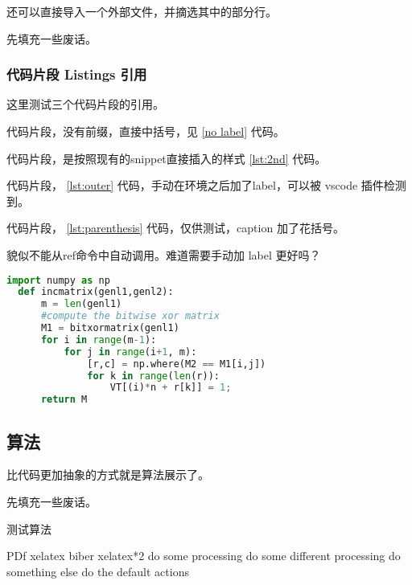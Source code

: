 \documentclass[../Main/thesis]{subfiles}
\begin{document}
还可以直接导入一个外部文件，并摘选其中的部分行。



先填充一些废话。\zhlipsum[12]

\subsubsection{代码片段 Listings 引用}

这里测试三个代码片段的引用。

代码片段，没有前缀，直接中括号，见 \ref{no label} 代码。

代码片段，是按照现有的snippet直接插入的样式 \ref{lst:2nd} 代码。

代码片段， \ref{lst:outer} 代码，手动在环境之后加了label，可以被 vscode 插件检测到。

代码片段， \ref{lst:parenthesis} 代码，仅供测试，caption 加了花括号。

貌似不能从ref命令中自动调用。难道需要手动加 label 更好吗？
\begin{lstlisting}[language=Python,
  caption={Must have Parenthesis},
  label=lst:parenthesis]
  import numpy as np
  def incmatrix(genl1,genl2):
      m = len(genl1)
      #compute the bitwise xor matrix
      M1 = bitxormatrix(genl1)
      for i in range(m-1):
          for j in range(i+1, m):
              [r,c] = np.where(M2 == M1[i,j])
              for k in range(len(r)):
                  VT[(i)*n + r[k]] = 1;
      return M
\end{lstlisting}
\subsection{算法}
\label{ssc:algo}

比代码更加抽象的方式就是算法展示了。

先填充一些废话。\zhlipsum[7]

\begin{minipage}{0.75\textwidth}

\begin{algorithm}[H]
  \caption{测试算法}
  \label{alg:test}
    \begin{algorithmic}[1]
      \REQUIRE PDf
      \ENSURE xelatex biber xelatex*2
      \STATE do some processing
      \STATE do some different processing
      \STATE do something else
      \ELSE
      \STATE do the default actions
      \ENDIF
    \end{algorithmic}
  \end{algorithm}

\end{minipage}
\newline
\end{document}
